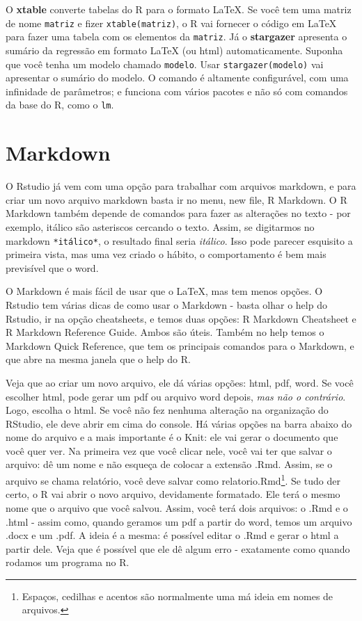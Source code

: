 \documentclass[]{book}
\let\rmarkdownfootnote\footnote%
\def\footnote{\protect\rmarkdownfootnote}
\begin{document}
O \textbf{xtable} converte tabelas do R para o formato LaTeX. Se você
tem uma matriz de nome \texttt{matriz} e fizer \texttt{xtable(matriz)},
o R vai fornecer o código em LaTeX para fazer uma tabela com os
elementos da \texttt{matriz}. Já o \textbf{stargazer} apresenta o
sumário da regressão em formato LaTeX (ou html) automaticamente. Suponha
que você tenha um modelo chamado \texttt{modelo}. Usar
\texttt{stargazer(modelo)} vai apresentar o sumário do modelo. O comando
é altamente configurável, com uma infinidade de parâmetros; e funciona
com vários pacotes e não só com comandos da base do R, como o
\texttt{lm}.

\section{Markdown}\label{markdown}

O Rstudio já vem com uma opção para trabalhar com arquivos markdown, e
para criar um novo arquivo markdown basta ir no menu, new file, R
Markdown. O R Markdown também depende de comandos para fazer as
alterações no texto - por exemplo, itálico são asteriscos cercando o
texto. Assim, se digitarmos no markdown \texttt{*itálico*}, o resultado
final seria \emph{itálico}. Isso pode parecer esquisito a primeira
vista, mas uma vez criado o hábito, o comportamento é bem mais
previsível que o word.

O Markdown é mais fácil de usar que o LaTeX, mas tem menos opções. O
Rstudio tem várias dicas de como usar o Markdown - basta olhar o help do
Rstudio, ir na opção cheatsheets, e temos duas opções: R Markdown
Cheatsheet e R Markdown Reference Guide. Ambos são úteis. Também no help
temos o Markdown Quick Reference, que tem os principais comandos para o
Markdown, e que abre na mesma janela que o help do R.

Veja que ao criar um novo arquivo, ele dá várias opções: html, pdf,
word. Se você escolher html, pode gerar um pdf ou arquivo word depois,
\emph{mas não o contrário}. Logo, escolha o html. Se você não fez
nenhuma alteração na organização do RStudio, ele deve abrir em cima do
console. Há várias opções na barra abaixo do nome do arquivo e a mais
importante é o Knit: ele vai gerar o documento que você quer ver. Na
primeira vez que você clicar nele, você vai ter que salvar o arquivo: dê
um nome e não esqueça de colocar a extensão .Rmd. Assim, se o arquivo se
chama relatório, você deve salvar como relatorio.Rmd\footnote{Espaços,
  cedilhas e acentos são normalmente uma má ideia em nomes de arquivos.}.
Se tudo der certo, o R vai abrir o novo arquivo, devidamente formatado.
Ele terá o mesmo nome que o arquivo que você salvou. Assim, você terá
dois arquivos: o .Rmd e o .html - assim como, quando geramos um pdf a
partir do word, temos um arquivo .docx e um .pdf. A ideia é a mesma: é
possível editar o .Rmd e gerar o html a partir dele. Veja que é possível
que ele dê algum erro - exatamente como quando rodamos um programa no R.
\end{document}
